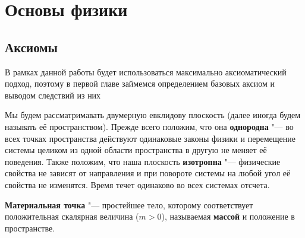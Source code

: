 \documentclass[a4paper, 12pt]{article}
\begin{document}
\section{Основы физики}
    \subsection{Аксиомы}
        В рамках данной работы будет использоваться максимально аксиоматический подход, 
        поэтому в первой главе займемся определением базовых аксиом и выводом следствий из них

        Мы будем рассматримавать двумерную евклидову плоскость (далее иногда будем называть её пространством). Прежде 
        всего положим, что она 
        \textbf{однородна} "--- во всех точках пространства действуют одинаковые законы физики и 
        перемещение системы целиком из одной области пространства в другую не меняет её поведения. 
        Также положим, что наша плоскость \textbf{изотропна} "--- физические свойства не зависят от направления
        и при повороте системы на любой угол её свойства не изменятся. Время течет одинаково во всех системах отсчета.

        \textbf{Материальная точка} "--- простейшее тело, которому соответствует положительная скалярная величина ($m>0$),
        называемая \textbf{массой} и положение в пространстве.
\end{document}
